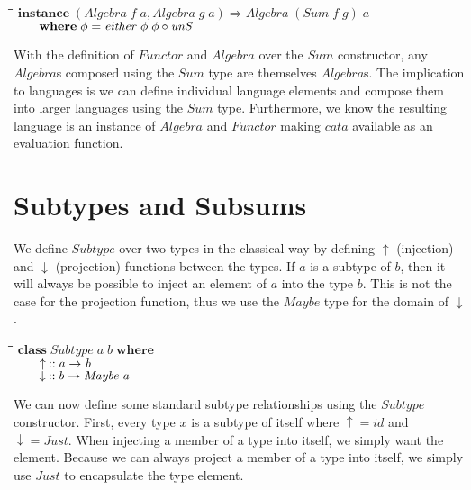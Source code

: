 \documentclass[11pt]{article}
\newlength{\lwidth}\setlength{\lwidth}{4.5cm}
\newlength{\cwidth}\setlength{\cwidth}{8mm} %
\newcommand{\Conid}[1]{\mathit{#1}}
\newcommand{\Varid}[1]{\mathit{#1}}
\begin{document}
\begin{tabbing}
\qquad\=\hspace{\lwidth}\=\hspace{\cwidth}\=\+\kill
${\mathbf{instance}\;(\Conid{Algebra}\;\Varid{f}\;\Varid{a},\Conid{Algebra}\;\Varid{g}\;\Varid{a})\Rightarrow \Conid{Algebra}\;(\Conid{Sum}\;\Varid{f}\;\Varid{g})\;\Varid{a}}$\\
${\hskip2.00em\relax\mathbf{where}\;\Varid{\phi}\mathrel{=}\Varid{either}\;\Varid{\phi}\;\Varid{\phi}\mathbin{\circ}\Varid{unS}}$
\end{tabbing}
With the definition of \ensuremath{\Conid{Functor}} and \ensuremath{\Conid{Algebra}} over the \ensuremath{\Conid{Sum}}
constructor, any \ensuremath{\Conid{Algebra}}s composed using the \ensuremath{\Conid{Sum}} type are
themselves \ensuremath{\Conid{Algebra}}s.  The implication to languages is we can define
individual language elements and compose them into larger languages
using the \ensuremath{\Conid{Sum}} type.  Furthermore, we know the resulting language is
an instance of \ensuremath{\Conid{Algebra}} and \ensuremath{\Conid{Functor}} making \ensuremath{\Varid{cata}} available as an
evaluation function.

\section{Subtypes and Subsums}

We define \ensuremath{\Conid{Subtype}} over two types in the classical way by defining
\ensuremath{\Varid{\uparrow}} (injection) and \ensuremath{\Varid{\downarrow}} (projection) functions between the types.
If \ensuremath{\Varid{a}} is a subtype of \ensuremath{\Varid{b}}, then it will always be possible to inject
an element of \ensuremath{\Varid{a}} into the type \ensuremath{\Varid{b}}.  This is not the case for the
projection function, thus we use the \ensuremath{\Conid{Maybe}} type for the domain of
\ensuremath{\Varid{\downarrow}}.

\begin{tabbing}
\qquad\=\hspace{\lwidth}\=\hspace{\cwidth}\=\+\kill
${\mathbf{class}\;\Conid{Subtype}\;\Varid{a}\;\Varid{b}\;\mathbf{where}}$\\
${\hskip2.00em\relax\Varid{\uparrow}\mathbin{::}\Varid{a}\to \Varid{b}}$\\
${\hskip2.00em\relax\Varid{\downarrow}\mathbin{::}\Varid{b}\to \Conid{Maybe}\;\Varid{a}}$
\end{tabbing}
We can now define some standard subtype relationships using the
\ensuremath{\Conid{Subtype}} constructor.  First, every type \ensuremath{\Varid{x}} is a subtype of itself
where \ensuremath{\Varid{\uparrow}\mathrel{=}\Varid{id}} and \ensuremath{\Varid{\downarrow}\mathrel{=}\Conid{Just}}.  When injecting a member of a type
into itself, we simply want the element.  Because we can always
project a member of a type into itself, we simply use \ensuremath{\Conid{Just}} to
encapsulate the type element.
\end{document}
